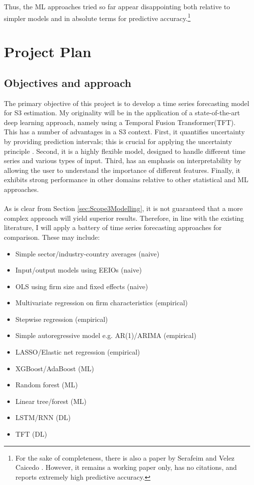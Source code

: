\documentclass[12pt,twoside]{report}
\begin{document}
\\\\
Thus, the ML approaches tried so far appear disappointing both relative to simpler models and in absolute terms for predictive accuracy.\footnote{For the sake of completeness, there is also a paper by Serafeim and Velez Caicedo \cite{Serafeim2022}. However, it remains a working paper only, has no citations, and reports extremely high predictive accuracy.}


\chapter{Project Plan}
\section{Objectives and approach}
The primary objective of this project is to develop a time series forecasting model for S3 estimation. My originality will be in the application of a state-of-the-art deep learning approach, namely using a Temporal Fusion
Transformer(TFT). This has a number of advantages in a S3 context. First, it quantifies uncertainty by providing prediction intervals; this is crucial for applying the uncertainty principle \cite{Hoepner2021, olesiewicz2023}. Second, it is a highly flexible model, designed to handle different time series and various types of input. Third, has an emphasis on interpretability by allowing the user to understand the importance of different features. Finally, it exhibits strong performance in other domains relative to other statistical and ML approaches.
\\\\
As is clear from Section \ref{sec:Scope3Modelling}, it is not guaranteed that a more complex approach will yield superior results. Therefore, in line with the existing literature, I will apply a battery of time series forecasting approaches for comparison. These may include:
\begin{itemize}
    \item Simple sector/industry-country averages (naive)
    \item Input/output models using EEIOs (naive)
    \item OLS using firm size and fixed effects (naive)
    \item Multivariate regression on firm characteristics (empirical)
    \item Stepwise regression (empirical)
    \item Simple autoregressive model e.g. AR(1)/ARIMA (empirical)
    \item LASSO/Elastic net regression (empirical)
    \item XGBoost/AdaBoost (ML)
    \item Random forest (ML)
    \item Linear tree/forest (ML)
    \item LSTM/RNN (DL)
    \item TFT (DL)
\end{itemize}
\end{document}
